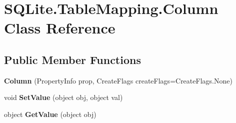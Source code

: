 \hypertarget{classSQLite_1_1TableMapping_1_1Column}{}\section{S\+Q\+Lite.\+Table\+Mapping.\+Column Class Reference}
\label{classSQLite_1_1TableMapping_1_1Column}
\subsection*{Public Member Functions}
\begin{DoxyCompactItemize}
\item 
\hypertarget{classSQLite_1_1TableMapping_1_1Column_a404e36f92ab57bcc8f903a78dc47badf}{}{\bfseries Column} (Property\+Info prop, Create\+Flags create\+Flags=Create\+Flags.\+None)\label{classSQLite_1_1TableMapping_1_1Column_a404e36f92ab57bcc8f903a78dc47badf}

\item 
\hypertarget{classSQLite_1_1TableMapping_1_1Column_a0f57d48181580599bd9b4aa6db68687c}{}void {\bfseries Set\+Value} (object obj, object val)\label{classSQLite_1_1TableMapping_1_1Column_a0f57d48181580599bd9b4aa6db68687c}

\item 
\hypertarget{classSQLite_1_1TableMapping_1_1Column_ac2e9f8110d390d1fa630ebb0d345c293}{}object {\bfseries Get\+Value} (object obj)\label{classSQLite_1_1TableMapping_1_1Column_ac2e9f8110d390d1fa630ebb0d345c293}

\end{DoxyCompactItemize}
